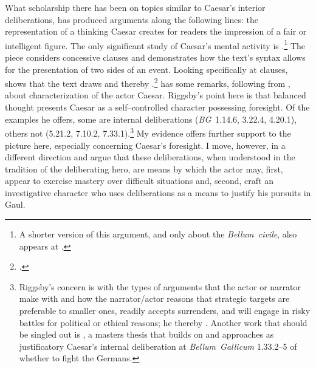 \documentclass[12pt,letterpaper,oneside,final]{memoir}
\begin{document}
What scholarship there has been on topics similar to Caesar's interior deliberations, has produced arguments along the following lines: the representation of a thinking Caesar creates for readers the impression of a fair or intelligent figure. The only significant study of Caesar's mental activity is \textcite{batstone1990}.\footnote{A shorter version of this argument, and only about the \emph{Bellum~civile}, also appears at \textcite[160--164]{batstonedamon2006}.} The piece considers concessive clauses and demonstrates how the text's syntax allows for the presentation of two sides of an event. Looking specifically at  clauses, \textcite{batstone1990} shows that the text draws  and thereby .\footnote{.} \textcite[193--195]{riggsby2006} has some remarks, following from \textcite{batstone1990}, about characterization of the actor Caesar. Riggsby's point here is that balanced thought presents Caesar as a self--controlled character possessing foresight. Of the examples he offers, some are internal deliberations (\emph{BG}~1.14.6, 3.22.4, 4.20.1), others not (5.21.2, 7.10.2, 7.33.1).\footnote{Riggsby's concern is with the types of arguments that the actor or narrator make with  and how the narrator/actor reasons that strategic targets are preferable to smaller ones, readily accepts surrenders, and will engage in risky battles for political or ethical reasons; he thereby . Another work that should be singled out is \textcite[48--52]{slonsky2008}, a masters thesis that builds on \textcite[192--195]{riggsby2006} and approaches as justificatory Caesar's internal deliberation at \emph{Bellum~Gallicum} 1.33.2--5 of whether to fight the Germans.} My evidence offers further support to the picture here, especially concerning Caesar's foresight. I move, however, in a different direction and argue that these deliberations, when understood in the tradition of the deliberating hero, are means by which the actor may, first, appear to exercise mastery over difficult situations and, second, craft an investigative character who uses deliberations as a means to justify his pursuits in Gaul.
\end{document}
